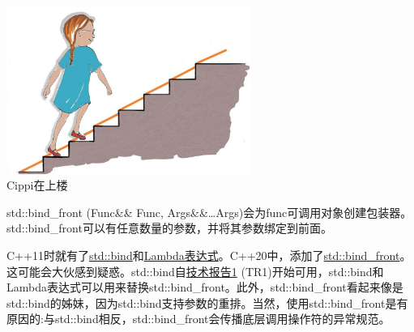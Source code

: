 \begin{center}
\includegraphics[width=0.6\textwidth]{content/3/chapter5/images/32.png}\\
Cippi在上楼
\end{center}


std::bind\_front (Func\&\& Func, Args\&\&…Args)会为func可调用对象创建包装器。std::bind\_front可以有任意数量的参数，并将其参数绑定到前面。

\begin{tcolorbox}[breakable,enhanced jigsaw,colback=blue!5!white,colframe=blue!75!black,title={std::bind\_front与std::bind}]
	
C++11时就有了\href{https://en.cppreference.com/w/cpp/utility/functional/bind}{std::bind}和\href{https://en.cppreference.com/w/cpp/language/lambda}{Lambda表达式}。C++20中，添加了\href{https://en.cppreference.com/w/cpp/utility/functional/bind_front}{std::bind\_front}。这可能会大伙感到疑惑。std::bind自\href{https://en.wikipedia.org/wiki/C%2B%2B_Technical_Report_1}{技术报告1} (TR1)开始可用，std::bind和Lambda表达式可以用来替换std::bind\_front。此外，std::bind\_front看起来像是std::bind的姊妹，因为std::bind支持参数的重排。当然，使用std::bind\_front是有原因的:与std::bind相反，std::bind\_front会传播底层调用操作符的异常规范。
	
\end{tcolorbox}

